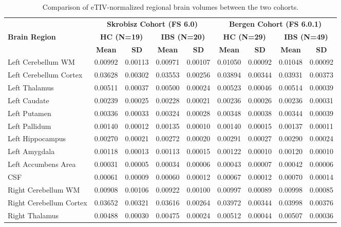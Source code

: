 \documentclass[diagnostics,article,accept,pdftex,moreauthors]{Definitions/mdpi}
\begin{document}
\begin{table}[H]
\setlength{\tabcolsep}{5pt}
\footnotesize
\caption{{Comparison of eTIV-normalized regional brain volumes between the two cohorts}.\label{tab:volume_comparison}}
\begin{tabular}{lcccccccc}
\hline
 & \multicolumn{4}{c}{\textbf{Skrobisz Cohort (FS 6.0)}} & \multicolumn{4}{c}{\textbf{Bergen Cohort (FS 6.0.1)}} \\
\textbf{Brain Region} & \multicolumn{2}{c}{\textbf{HC (N=19)}} & \multicolumn{2}{c}{\textbf{IBS (N=20)}} & \multicolumn{2}{c}{\textbf{HC (N=29)}} & \multicolumn{2}{c}{\textbf{IBS (N=49)}} \\
 & \textbf{Mean} & \textbf{SD} & \textbf{Mean} & \textbf{SD} & \textbf{Mean} & \textbf{SD} & \textbf{Mean} & \textbf{SD} \\
\hline
Left Cerebellum WM & 0.00992 & 0.00113 & 0.00971 & 0.00107 & 0.01050 & 0.00092 & 0.01048 & 0.00092 \\
Left Cerebellum Cortex & 0.03628 & 0.00302 & 0.03553 & 0.00256 & 0.03894 & 0.00344 & 0.03931 & 0.00373 \\
Left Thalamus & 0.00511 & 0.00037 & 0.00500 & 0.00024 & 0.00523 & 0.00046 & 0.00514 & 0.00039 \\
Left Caudate & 0.00239 & 0.00025 & 0.00228 & 0.00021 & 0.00236 & 0.00026 & 0.00236 & 0.00031 \\
Left Putamen & 0.00336 & 0.00033 & 0.00324 & 0.00028 & 0.00348 & 0.00038 & 0.00344 & 0.00039 \\
Left Pallidum & 0.00140 & 0.00012 & 0.00135 & 0.00010 & 0.00140 & 0.00015 & 0.00137 & 0.00011 \\
Left Hippocampus & 0.00270 & 0.00021 & 0.00272 & 0.00020 & 0.00291 & 0.00027 & 0.00290 & 0.00024 \\
Left Amygdala & 0.00118 & 0.00013 & 0.00113 & 0.00015 & 0.00122 & 0.00010 & 0.00120 & 0.00010 \\
Left Accumbens Area & 0.00031 & 0.00005 & 0.00034 & 0.00006 & 0.00043 & 0.00007 & 0.00042 & 0.00006 \\
CSF & 0.00061 & 0.00009 & 0.00060 & 0.00012 & 0.00067 & 0.00012 & 0.00070 & 0.00014 \\
Right Cerebellum WM & 0.00908 & 0.00106 & 0.00922 & 0.00100 & 0.00997 & 0.00089 & 0.00998 & 0.00085 \\
Right Cerebellum Cortex & 0.03652 & 0.00321 & 0.03616 & 0.00264 & 0.03972 & 0.00344 & 0.03998 & 0.00376 \\
Right Thalamus & 0.00488 & 0.00030 & 0.00475 & 0.00024 & 0.00512 & 0.00044 & 0.00507 & 0.00036 \\

\end{tabular}
\end{table}
\end{document}
